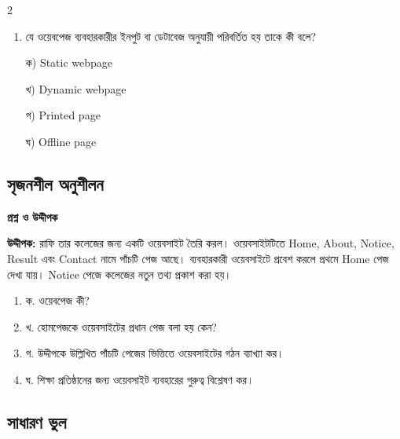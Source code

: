 \begin{multicols}{2}
\begin{enumerate}[leftmargin=*,itemsep=5pt]
\item \begin{minipage}[t]{\linewidth}\vspace{0pt}
যে ওয়েবপেজ ব্যবহারকারীর ইনপুট বা ডেটাবেজ অনুযায়ী পরিবর্তিত হয় তাকে কী বলে?
\par ক) Static webpage
\par খ) Dynamic webpage
\par গ) Printed page
\par ঘ) Offline page\\
\end{minipage}
\end{enumerate}
\end{multicols}

\subsection{সৃজনশীল অনুশীলন}

\noindent
\textbf{\color{chFourRose}প্রশ্ন ও উদ্দীপক}\par
\textbf{উদ্দীপক:} রাফি তার কলেজের জন্য একটি ওয়েবসাইট তৈরি করল। ওয়েবসাইটটিতে Home, About, Notice, Result এবং Contact নামে পাঁচটি পেজ আছে। ব্যবহারকারী ওয়েবসাইটে প্রবেশ করলে প্রথমে Home পেজ দেখা যায়। Notice পেজে কলেজের নতুন তথ্য প্রকাশ করা হয়।

\begin{enumerate}
\item ক. ওয়েবপেজ কী?
\item খ. হোমপেজকে ওয়েবসাইটের প্রধান পেজ বলা হয় কেন?
\item গ. উদ্দীপকে উল্লিখিত পাঁচটি পেজের ভিত্তিতে ওয়েবসাইটের গঠন ব্যাখ্যা কর।
\item ঘ. শিক্ষা প্রতিষ্ঠানের জন্য ওয়েবসাইট ব্যবহারের গুরুত্ব বিশ্লেষণ কর।
\end{enumerate}
\par\smallskip
\subsection{সাধারণ ভুল}

